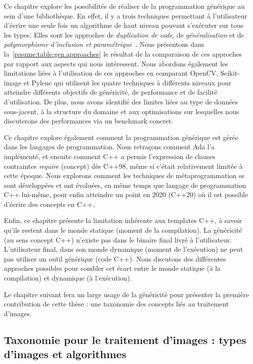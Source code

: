 Ce chapitre explore les possibilités de réaliser de la programmation générique au sein d'une bibliothèque. En effet, il
y a trois techniques permettant à l'utilisateur d'écrire une seule fois un algorithme de haut niveau pouvant s'exécuter
sur tous les types. Elles sont les approches de \emph{duplication de code}, de \emph{généralisation} et de
\emph{polymorphisme d'inclusion et paramétrique}~\parencite{gibbons.2007.datatype}. Nous présentons dans
la~\cref{resume:table:gen.approaches} le résultat de la comparaison de ces approches par rapport aux aspects qui nous
intéressent. Nous abordons également les limitations liées à l'utilisation de ces approches en comparant OpenCV,
Scikit-image et Pylene qui utilisent les quatre techniques à différents niveaux pour atteindre différents objectifs de
généricité, de performance et de facilité d'utilisation. De plus, nous avons identifié des limites liées au type de
données sous-jacent, à la structure du domaine et aux optimisations sur lesquelles nous discuterons des performances via
un benchmark concret.

Ce chapitre explore également comment la programmation générique est gérée dans les langages de programmation. Nous
retraçons comment Ada l'a implémenté, et ensuite comment C++ a permis l'expression de clauses contraintes \emph{require}
(concept) dès C++98, même si c'était relativement limitée à cette époque. Nous explorons comment les techniques de
métaprogrammation se sont développées et ont évoluées, en même temps que langage de programmation C++ lui-même, pour
enfin atteindre un point en 2020 (C++20) où il est possible d'écrire des concepts en C++.

Enfin, ce chapitre présente la limitation inhérente aux templates C++, à savoir qu'ils restent dans le monde statique
(moment de la compilation). La généricité (au sens concept C++) n'existe pas dans le binaire final livré à
l'utilisateur. L'utilisateur final, dans son monde dynamique (moment de l'exécution) ne peut pas utiliser un outil
générique (code C++). Nous discutons des différentes approches possibles pour combler cet écart entre le monde statique
(à la compilation) et dynamique (à l'exécution).

Le chapitre suivant fera un large usage de la généricité pour présenter la première contribution de cette thèse : une
taxonomie des concepts liés au traitement d'images.


\subsection*{Taxonomie pour le traitement d'images : types d'images et algorithmes}



